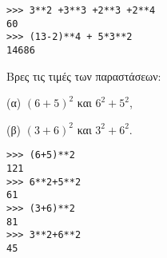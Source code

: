 \begin{lstlisting}
>>> 3**2 +3**3 +2**3 +2**4
60
>>> (13-2)**4 + 5*3**2
14686
\end{lstlisting}

\begin{exercise}
Βρες τις τιμές των παραστάσεων: 

(α) $(6+5)^2$ και $6^2+5^2$, 

(β) $(3+6)^2$ και $3^2+6^2$.
\end{exercise}
\begin{lstlisting}
>>> (6+5)**2
121
>>> 6**2+5**2
61
>>> (3+6)**2
81
>>> 3**2+6**2
45
\end{lstlisting}